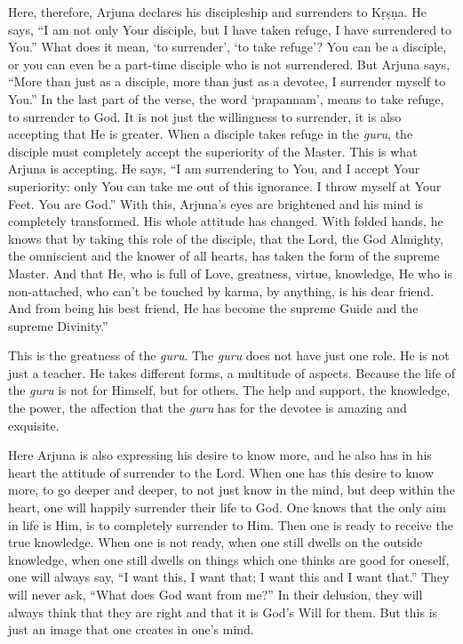 Here, therefore, Arjuna declares his discipleship and surrenders to Kṛṣṇa. He says, “I am not only Your disciple, but I have taken refuge, I have surrendered to You.” What does it mean, ‘to surrender’, ‘to take refuge’? You can be a disciple, or you can even be a part-time disciple who is not surrendered. But Arjuna says, “More than just as a disciple, more than just as a devotee, I surrender myself to You.” In the last part of the verse, the word ‘prapannam’, means to take refuge, to surrender to God. It is not just the willingness to surrender, it is also accepting that He is greater. When a disciple takes refuge in the \textit{guru}, the disciple must completely accept the superiority of the Master. This is what Arjuna is accepting. He says, “I am surrendering to You, and I accept Your superiority: only You can take me out of this ignorance. I throw myself at Your Feet. You are God.” With this, Arjuna’s eyes are brightened and his mind is completely transformed. His whole attitude has changed. With folded hands, he knows that by taking this role of the disciple, that the Lord, the God Almighty, the omniscient and the knower of all hearts, has taken the form of the supreme Master. And that He, who is full of Love, greatness, virtue, knowledge, He who is non-attached, who can’t be touched by karma, by anything, is his dear friend. And from being his best friend, He has become the supreme Guide and the supreme Divinity.”

This is the greatness of the \textit{guru}. The \textit{guru} does not have just one role. He is not just a teacher. He takes different forms, a multitude of aspects. Because the life of the \textit{guru} is not for Himself, but for others. The help and support, the knowledge, the power, the affection that the \textit{guru} has for the devotee is amazing and exquisite.

Here Arjuna is also expressing his desire to know more, and he also has in his heart the attitude of surrender to the Lord. When one has this desire to know more, to go deeper and deeper, to not just know in the mind, but deep within the heart, one will happily surrender their life to God. One knows that the only aim in life is Him, is to completely surrender to Him. Then one is ready to receive the true knowledge. When one is not ready, when one still dwells on the outside knowledge, when one still dwells on things which one thinks are good for oneself, one will always say, “I want this, I want that; I want this and I want that.” They will never ask, “What does God want from me?” In their delusion, they will always think that they are right and that it is God’s Will for them. But this is just an image that one creates in one’s mind.

